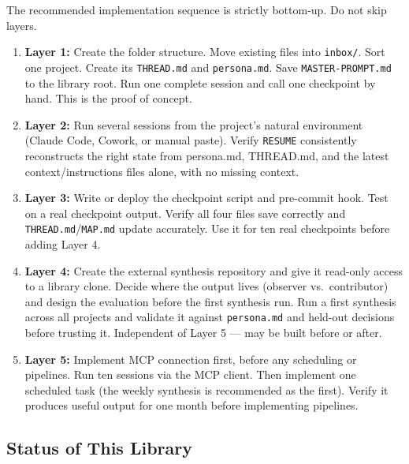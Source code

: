 \documentclass[12pt,letterpaper]{article}
\begin{document}
The recommended implementation sequence is strictly bottom-up.
Do not skip layers.

\begin{enumerate}
  \item \textbf{Layer 1:} Create the folder structure. Move existing
        files into \texttt{inbox/}. Sort one project. Create its
        \texttt{THREAD.md} and \texttt{persona.md}. Save
        \texttt{MASTER-PROMPT.md} to the library root. Run one
        complete session and call one checkpoint by hand. This is the
        proof of concept.

  \item \textbf{Layer 2:} Run several sessions from the project's
        natural environment (Claude Code, Cowork, or manual paste).
        Verify \texttt{RESUME} consistently reconstructs the right
        state from persona.md, THREAD.md, and the latest
        context/instructions files alone, with no missing context.

  \item \textbf{Layer 3:} Write or deploy the checkpoint script and
        pre-commit hook. Test on a real checkpoint output. Verify all
        four files save correctly and \texttt{THREAD.md}/\texttt{MAP.md}
        update accurately. Use it for ten real checkpoints before
        adding Layer 4.

  \item \textbf{Layer 4:} Create the external synthesis repository and
        give it read-only access to a library clone. Decide where the
        output lives (observer vs.\ contributor) and design the
        evaluation before the first synthesis run. Run a first
        synthesis across all projects and validate it against
        \texttt{persona.md} and held-out decisions before trusting it.
        Independent of Layer 5 --- may be built before or after.

  \item \textbf{Layer 5:} Implement MCP connection first, before any
        scheduling or pipelines. Run ten sessions via the MCP client.
        Then implement one scheduled task (the weekly synthesis is
        recommended as the first). Verify it produces useful output
        for one month before implementing pipelines.
\end{enumerate}

\subsection{Status of This Library}
\end{document}
